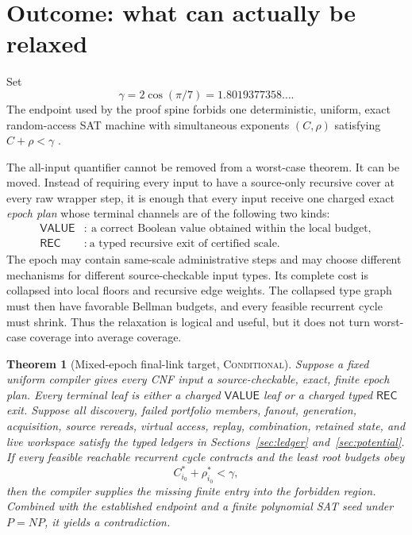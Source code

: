 \documentclass[11pt]{article}
\newtheorem{theorem}{Theorem}[section]
\newcommand{\VALUE}{\mathsf{VALUE}}
\newcommand{\REC}{\mathsf{REC}}
\newcommand{\rootT}{i_0}
\begin{document}
\section{Outcome: what can actually be relaxed}

Set
\[
 \gamma=2\cos(\pi/7)=1.8019377358\ldots.
\]
The endpoint used by the proof spine forbids one deterministic, uniform,
exact random-access SAT machine with simultaneous exponents \((C,\rho)\)
satisfying \(C+\rho<\gamma\) \cite{Williams2010,FortnowEtAl2005}.

The all-input quantifier cannot be removed from a worst-case theorem.  It can
be moved.  Instead of requiring every input to have a source-only recursive
cover at every raw wrapper step, it is enough that every input receive one
charged exact \emph{epoch plan} whose terminal channels are of the following
two kinds:
\begin{align*}
 \VALUE&:\ \text{a correct Boolean value obtained within the local budget},\\
 \REC&:\ \text{a typed recursive exit of certified scale.}
\end{align*}
The epoch may contain same-scale administrative steps and may choose different
mechanisms for different source-checkable input types.  Its complete cost is
collapsed into local floors and recursive edge weights.  The collapsed type
graph must then have favorable Bellman budgets, and every feasible recurrent
cycle must shrink.  Thus the relaxation is logical and useful, but it does
not turn worst-case coverage into average coverage.

\begin{theorem}[Mixed-epoch final-link target, \textsc{Conditional}]
Suppose a fixed uniform compiler gives every CNF input a source-checkable,
exact, finite epoch plan.  Every terminal leaf is either a charged \(\VALUE\)
leaf or a charged typed \(\REC\) exit.  Suppose all discovery, failed
portfolio members, fanout, generation, acquisition, source rereads, virtual
access, replay, combination, retained state, and live workspace satisfy the
typed ledgers in Sections~\ref{sec:ledger} and~\ref{sec:potential}.  If every
feasible reachable recurrent cycle contracts and the least root budgets obey
\[
 C_{\rootT}^*+\rho_{\rootT}^*<\gamma,
\]
then the compiler supplies the missing finite entry into the forbidden
region.  Combined with the established endpoint and a finite polynomial SAT
seed under \(P=NP\), it yields a contradiction.
\end{theorem}
\end{document}
